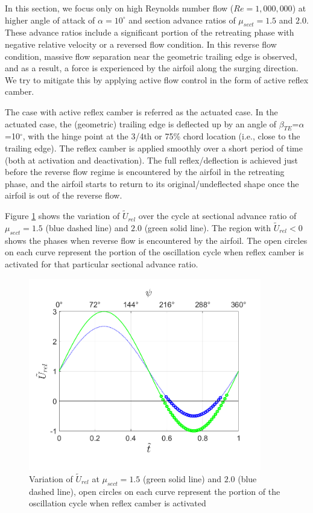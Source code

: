 In this section, we focus only on high Reynolds number flow ($Re=1,000,000$) at higher angle of attack of $\alpha=10^\circ$ and section advance ratios of $\mu_{sect}= 1.5$ and $2.0$. These advance ratios include a significant portion of the retreating phase with negative relative velocity or a reversed flow condition. 
In this reverse flow condition, massive flow separation near the geometric trailing edge is observed, and as a result, a force is experienced by the airfoil along the surging direction. We try to mitigate this by applying active flow control in the form of active reflex camber. 

The case with active reflex camber is referred as the actuated case.
In the actuated case, the (geometric) trailing edge is deflected up by an angle of $\beta_{TE}$=$\alpha$=10$^\circ$, with the hinge point at the 3/4th or 75\% chord location (i.e., close to the trailing edge).
The reflex camber is applied smoothly over a short period of time (both at activation and deactivation).
The full reflex/deflection is achieved just before the reverse flow regime is encountered by the airfoil in the retreating phase, and the airfoil starts to return to its original/undeflected shape once the airfoil is out of the reverse flow.

Figure \ref{fig:U_rel} shows the variation of $\tilde{U}_{rel}$ over the cycle at sectional advance ratio of $\mu_{sect}=1.5$ (blue dashed line) and $2.0$ (green solid line). The region with $\tilde{U}_{rel}<0$ shows the phases when reverse flow is encountered by the airfoil. The open circles on each curve represent the portion of the oscillation cycle when reflex camber is activated for that particular sectional advance ratio.


\begin{figure}[H]
	\begin{center}
\texttt{}		\includegraphics[width=4in]{figures/U_rel_vs_t_tilde_without_lines.png}
		\caption{Variation of $\tilde{U}_{rel}$ at $\mu_{sect}=1.5$ (green solid line) and $2.0$ (blue dashed line), open circles on each curve represent the portion of the oscillation cycle when reflex camber is activated}
		\label{fig:U_rel}
	\end{center}
\end{figure}



